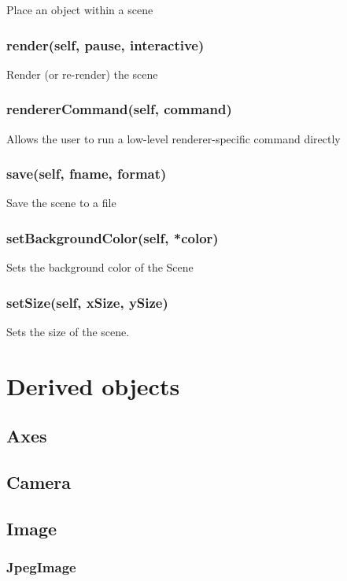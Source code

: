 Place an object within a scene

\subsubsection{render(self, pause, interactive)}

Render (or re-render) the scene

\subsubsection{rendererCommand(self, command)}

Allows the user to run a low-level renderer-specific command directly

\subsubsection{save(self, fname, format)}

Save the scene to a file

\subsubsection{setBackgroundColor(self, *color)}

Sets the background color of the Scene

\subsubsection{setSize(self, xSize, ySize)}

Sets the size of the scene.

\section{Derived objects}

\subsection{Axes}

\subsection{Camera}

\subsection{Image}

\subsubsection{JpegImage}

